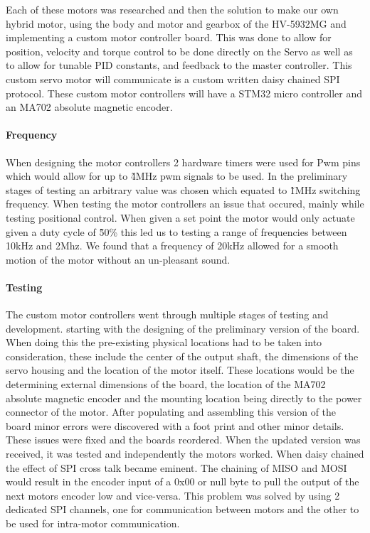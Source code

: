             Each of these motors was researched and then the solution to make our own hybrid motor, using the body and motor and gearbox of the HV-5932MG and implementing a custom motor controller board. This was done to allow for position, velocity and torque control to be done directly on the Servo as well as to allow for tunable PID constants, and feedback to the master controller. This custom servo motor will communicate is a custom written daisy chained SPI protocol. These custom motor controllers will have a STM32 micro controller and an MA702 absolute magnetic encoder\cite{MA702}.
            \paragraph{Frequency}
            When designing the motor controllers 2 hardware timers were used for Pwm pins which would allow for up to \~4MHz pwm signals to be used. In the preliminary stages of testing an arbitrary value was chosen which equated to \~1MHz switching frequency. When testing the motor controllers an issue that occured, mainly while testing positional control. When given a set point the motor would only actuate given a duty cycle of  \~50\% this led us to testing a range of frequencies between 10kHz and 2Mhz. We found that a frequency of 20kHz allowed for a smooth motion of the motor without an un-pleasant sound.  
            \paragraph{Testing} 
            The custom motor controllers went through multiple stages of testing and development. starting with the designing of the preliminary version of the board. When doing this the pre-existing physical locations had to be taken into consideration, these include the center of the output shaft, the dimensions of the servo housing and the location of the motor itself. These locations would be the determining external dimensions of the board, the location of the MA702 absolute magnetic encoder and the mounting location being directly to the power connector of the motor. After populating and assembling this version of the board minor errors were discovered with a foot print and other minor details. These issues were fixed and the boards reordered. When the updated version was received, it was tested and independently the motors worked. When daisy chained the effect of SPI cross talk became eminent. The chaining of MISO and MOSI would result in the encoder input of a 0x00 or null byte to pull the output of the next motors encoder low and vice-versa. This problem was solved by using 2 dedicated SPI channels, one for communication between motors and the other to be used for intra-motor communication. 
            
